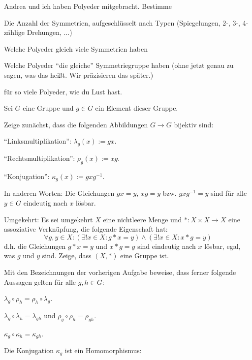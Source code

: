 \begin{sheet}

\begin{problem}
Andrea und ich haben Polyeder mitgebracht. Bestimme
\begin{subproblem}
Die Anzahl der Symmetrien, aufgeschlüsselt nach Typen (Spiegelungen, 2-, 3-, 4-zählige Drehungen, ...)
\end{subproblem}
\begin{subproblem}
Welche Polyeder gleich viele Symmetrien haben
\end{subproblem}
\begin{subproblem}
Welche Polyeder \enquote{die gleiche} Symmetriegruppe haben (ohne jetzt genau zu sagen, was das heißt. Wir präzisieren das später.)
\end{subproblem}
für so viele Polyeder, wie du Lust hast.
\end{problem}

\begin{problem}
Sei $G$ eine Gruppe und $g\in G$ ein Element dieser Gruppe.

Zeige zunächst, dass die folgenden Abbildungen $G\to G$ bijektiv sind:
\begin{subproblem}
\enquote{Linksmultiplikation}: $\lambda_g(x):=gx$.
\end{subproblem}
\begin{subproblem}
\enquote{Rechtsmultiplikation}: $\rho_g(x):=xg$.
\end{subproblem}
\begin{subproblem}
\enquote{Konjugation}: $\kappa_g(x):=gxg^{-1}$.
\end{subproblem}
In anderen Worten: Die Gleichungen $gx=y$, $xg=y$ bzw. $gxg^{-1} = y$ sind für alle $y\in G$ eindeutig nach $x$ lösbar.

\begin{subproblem}[difficulty={mittel}]
Umgekehrt: Es sei umgekehrt $X$ eine nichtleere Menge und $\ast: X\times X\to X$ eine assoziative Verknüpfung, die folgende Eigenschaft hat:
\[\forall g,y\in X: (\exists! x\in X: g \ast x=y) \wedge (\exists! x\in X: x \ast g=y)\]
d.h. die Gleichungen $g \ast x=y$ und $x \ast g=y$ sind eindeutig nach $x$ lösbar, egal, was $g$ und $y$ sind. Zeige, dass $(X,\ast)$ eine Gruppe ist.
\end{subproblem}
\end{problem}

\begin{problem}
Mit den Bezeichnungen der vorherigen Aufgabe beweise, dass ferner folgende Aussagen gelten für alle $g,h\in G$:
\begin{subproblem}
$\lambda_g \circ \rho_h = \rho_h \circ \lambda_g$.
\end{subproblem}
\begin{subproblem}
$\lambda_g \circ \lambda_h = \lambda_{gh}$ und $\rho_g \circ \rho_h = \rho_{gh}$.
\end{subproblem}
\begin{subproblem}
$\kappa_g\circ\kappa_h = \kappa_{gh}$.
\end{subproblem}
\begin{subproblem}
Die Konjugation $\kappa_g$ ist ein Homomorphismus:


\end{subproblem}
\end{problem}
\end{sheet}

